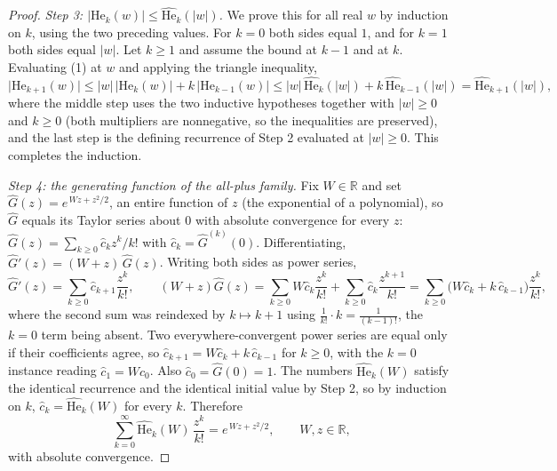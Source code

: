 \begin{proof}
\emph{Step 3: $|\mathrm{He}_k(w)| \leq \widehat{\mathrm{He}}_k(|w|)$.}
We prove this for all real $w$ by induction on $k$, using the two preceding
values.  For $k = 0$ both sides equal $1$, and for $k = 1$ both sides equal
$|w|$.  Let $k \geq 1$ and assume the bound at $k-1$ and at $k$.  Evaluating (1)
at $w$ and applying the triangle inequality,
\[
  \bigl|\mathrm{He}_{k+1}(w)\bigr|
    \leq |w|\,\bigl|\mathrm{He}_k(w)\bigr| + k\,\bigl|\mathrm{He}_{k-1}(w)\bigr|
    \leq |w|\,\widehat{\mathrm{He}}_k(|w|) + k\,\widehat{\mathrm{He}}_{k-1}(|w|)
    = \widehat{\mathrm{He}}_{k+1}(|w|),
\]
where the middle step uses the two inductive hypotheses together with
$|w| \geq 0$ and $k \geq 0$ (both multipliers are nonnegative, so the
inequalities are preserved), and the last step is the defining recurrence of
Step 2 evaluated at $|w| \geq 0$.  This completes the induction.

\emph{Step 4: the generating function of the all-plus family.}
Fix $W \in \mathbb{R}$ and set $\widehat{G}(z) = e^{\,Wz + z^2/2}$, an entire
function of $z$ (the exponential of a polynomial), so $\widehat G$ equals its
Taylor series about $0$ with absolute convergence for every $z$:
$\widehat G(z) = \sum_{k\geq0} \hat c_k z^k/k!$ with
$\hat c_k = \widehat G^{(k)}(0)$.  Differentiating,
$\widehat G'(z) = (W + z)\,\widehat G(z)$.  Writing both sides as power series,
\[
  \widehat G'(z) = \sum_{k\geq0} \hat c_{k+1}\frac{z^k}{k!},
  \qquad
  (W+z)\widehat G(z)
    = \sum_{k\geq0} W\hat c_k \frac{z^k}{k!}
      + \sum_{k\geq0} \hat c_k \frac{z^{k+1}}{k!}
    = \sum_{k\geq0}\bigl(W\hat c_k + k\,\hat c_{k-1}\bigr)\frac{z^k}{k!},
\]
where the second sum was reindexed by $k \mapsto k+1$ using
$\frac{1}{k!}\cdot k = \frac{1}{(k-1)!}$, the $k=0$ term being absent.  Two
everywhere-convergent power series are equal only if their coefficients agree, so
$\hat c_{k+1} = W\hat c_k + k\,\hat c_{k-1}$ for $k \geq 0$, with the $k=0$
instance reading $\hat c_1 = W\hat c_0$.  Also $\hat c_0 = \widehat G(0) = 1$.
The numbers $\widehat{\mathrm{He}}_k(W)$ satisfy the identical recurrence and the
identical initial value by Step 2, so by induction on $k$,
$\hat c_k = \widehat{\mathrm{He}}_k(W)$ for every $k$.  Therefore
\begin{equation*}
  \sum_{k=0}^\infty \widehat{\mathrm{He}}_k(W)\,\frac{z^k}{k!}
    = e^{\,Wz + z^2/2},
  \qquad W, z \in \mathbb{R}, \tag{3}
\end{equation*}
with absolute convergence.


\end{proof}
